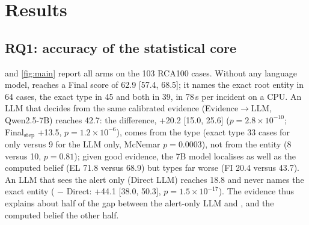\section{Results}\label{sec:results}

\subsection{RQ1: accuracy of the statistical core}\label{sec:main}

 and \cref{fig:main} report all arms on the 103 RCA100 cases. Without any language model, \core{} reaches a Final score
of 62.9 [57.4, 68.5]; it names the exact root entity in 64 cases, the exact type in 45 and both in 39, in 78\,s per incident on a
CPU. An LLM that decides from the same calibrated evidence (Evidence$\rightarrow$LLM, Qwen2.5-7B) reaches 42.7: the difference,
+20.2 [15.0, 25.6] ($p=2.8\times10^{-10}$; Final$_\text{step}$ +13.5, $p=1.2\times10^{-6}$), comes from the type (exact type 33 cases
for \core{} only versus 9 for the LLM only, McNemar $p=0.0003$), not from the entity (8 versus 10, $p=0.81$); given good evidence,
the 7B model localises as well as the computed belief (EL 71.8 versus 68.9) but types far worse (FI 20.4 versus 43.7). An LLM that
sees the alert only (Direct LLM) reaches 18.8 and never names the exact entity (\core{} $-$ Direct: +44.1 [38.0, 50.3],
$p=1.5\times10^{-17}$). The evidence thus explains about half of the gap between the alert-only LLM and \core{}, and the computed
belief the other half.

